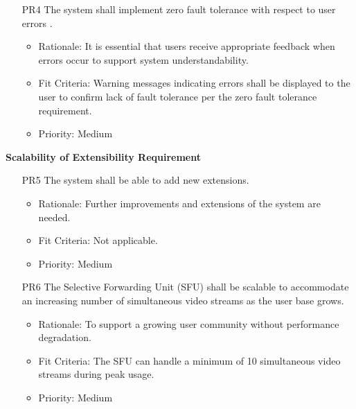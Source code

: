 \documentclass[12pt]{article}
\begin{document}
\begin{itemize}
    \item[PR4] The system shall implement zero fault tolerance with respect to user errors
    . \label{PR4}
    \begin{itemize}
        \item Rationale: It is essential that users receive appropriate feedback when errors occur to support system understandability.
        \item Fit Criteria: Warning messages indicating errors shall be displayed to the user to confirm lack of fault tolerance per the zero fault tolerance requirement.
        \item Priority: Medium
    \end{itemize}
\end{itemize}
\textbf{Scalability of Extensibility Requirement}
\begin{itemize}
    \item[PR5] The system shall be able to add new extensions. \label{PR5}
    \begin{itemize}
        \item Rationale: Further improvements and extensions of the system are needed.
        \item Fit Criteria: Not applicable.
        \item Priority: Medium
    \end{itemize}
\end{itemize}
\begin{itemize}
    \item[PR6] The Selective Forwarding Unit (SFU) shall be scalable to accommodate an increasing number of simultaneous video streams as the user base grows. \label{PR6}
    \begin{itemize}
        \item Rationale: To support a growing user community without performance degradation.
        \item Fit Criteria: The SFU can handle a minimum of 10 simultaneous video streams during peak usage.
        \item Priority: Medium
    \end{itemize}
\end{itemize}
\end{document}
